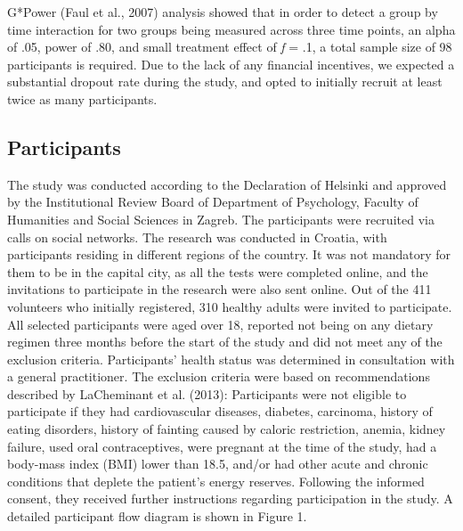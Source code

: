 \documentclass[authordate, empirical]{jote-new-article}
\begin{document}
G*Power (Faul et al., 2007) analysis showed that in order to detect a group by time interaction for two groups being measured across three time points, an alpha of .05, power of .80, and small treatment effect of \emph{f }= .1, a total sample size of 98 participants is required. Due to the lack of any financial incentives, we expected a substantial dropout rate during the study, and opted to initially recruit at least twice as many participants.



\subsection{Participants}



The study was conducted according to the Declaration of Helsinki and approved by the Institutional Review Board of Department of Psychology, Faculty of Humanities and Social Sciences in Zagreb. The participants were recruited via calls on social networks. The research was conducted in Croatia, with participants residing in different regions of the country. It was not mandatory for them to be in the capital city, as all the tests were completed online, and the invitations to participate in the research were also sent online. Out of the 411 volunteers who initially registered, 310 healthy adults were invited to participate. All selected participants were aged over 18, reported not being on any dietary regimen three months before the start of the study and did not meet any of the exclusion criteria. Participants' health status was determined in consultation with a general practitioner. The exclusion criteria were based on recommendations described by LaCheminant et al. (2013): Participants were not eligible to participate if they had cardiovascular diseases, diabetes, carcinoma, history of eating disorders, history of fainting caused by caloric restriction, anemia, kidney failure, used oral contraceptives, were pregnant at the time of the study, had a body-mass index (BMI) lower than 18.5, and/or had other acute and chronic conditions that deplete the patient's energy reserves. Following the informed consent, they received further instructions regarding participation in the study. A detailed participant flow diagram is shown in Figure 1.
\end{document}
